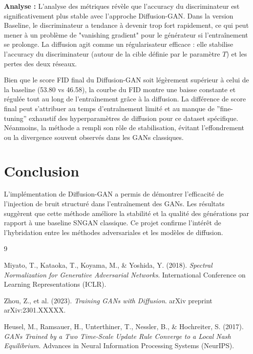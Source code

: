 \documentclass[a4paper,11pt]{article}
\begin{document}
\textbf{Analyse :}
L'analyse des métriques révèle que l'accuracy du discriminateur est significativement plus stable avec l'approche Diffusion-GAN. Dans la version Baseline, le discriminateur a tendance à devenir trop fort rapidement, ce qui peut mener à un problème de "vanishing gradient" pour le générateur si l'entraînement se prolonge. La diffusion agit comme un régularisateur efficace : elle stabilise l'accuracy du discriminateur (autour de la cible définie par le paramètre $T$) et les pertes des deux réseaux.

Bien que le score FID final du Diffusion-GAN soit légèrement supérieur à celui de la baseline (53.80 vs 46.58), la courbe du FID montre une baisse constante et régulée tout au long de l'entraînement grâce à la diffusion. La différence de score final peut s'attribuer au temps d'entraînement limité et au manque de ''fine-tuning'' exhaustif des hyperparamètres de diffusion pour ce dataset spécifique. Néanmoins, la méthode a rempli son rôle de stabilisation, évitant l'effondrement ou la divergence souvent observés dans les GANs classiques.

\section{Conclusion}
L'implémentation de Diffusion-GAN a permis de démontrer l'efficacité de l'injection de bruit structuré dans l'entraînement des GANs. Les résultats suggèrent que cette méthode améliore la stabilité et la qualité des générations par rapport à une baseline SNGAN classique. Ce projet confirme l'intérêt de l'hybridation entre les méthodes adversariales et les modèles de diffusion.

\begin{thebibliography}{9}

Miyato, T., Kataoka, T., Koyama, M., \& Yoshida, Y. (2018).
\textit{Spectral Normalization for Generative Adversarial Networks}.
International Conference on Learning Representations (ICLR).

Zhou, Z., et al. (2023).
\textit{Training GANs with Diffusion}.
arXiv preprint arXiv:2301.XXXXX.

Heusel, M., Ramsauer, H., Unterthiner, T., Nessler, B., \& Hochreiter, S. (2017).
\textit{GANs Trained by a Two Time-Scale Update Rule Converge to a Local Nash Equilibrium}.
Advances in Neural Information Processing Systems (NeurIPS).

\end{thebibliography}
\end{document}
